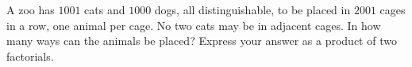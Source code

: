 A zoo has $1001$ cats and $1000$ dogs, all distinguishable, to be placed in $2001$ cages in a row, one animal per cage. No two cats may be in adjacent cages. In how many ways can the animals be placed? Express your answer as a product of two factorials.
